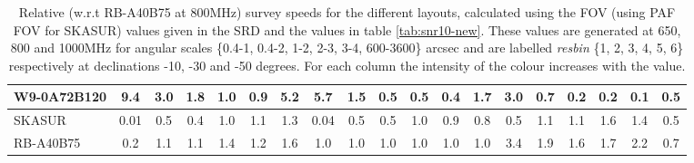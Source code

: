 \begin{table}[!htp]
{{\begin{tabular}{|lcccccc||cccccc||cccccc|}
W9-0A72B120 & 9.4 \cellcolor{blue!57.37} & 3.0 \cellcolor{red!54.92} & 1.8 \cellcolor{green!52.57} & 1.0 \cellcolor{orange!18.00} & 0.9 \cellcolor{purple!18.00} & 5.2 \cellcolor{blue!50.17} & 5.7 \cellcolor{blue!56.19} & 1.5 \cellcolor{red!51.92} & 0.5 \cellcolor{green!22.67} & 0.5 \cellcolor{orange!18.00} & 0.4 \cellcolor{purple!18.00} & 1.7 \cellcolor{blue!51.92} & 3.0 \cellcolor{blue!53.76} & 0.7 \cellcolor{red!24.89} & 0.2 \cellcolor{green!18.00} & 0.2 \cellcolor{orange!18.00} & 0.1 \cellcolor{purple!18.00} & 0.5 \cellcolor{blue!18.00}\\ \hline 
SKASUR & 0.01 \cellcolor{blue!18.00} & 0.5 \cellcolor{red!18.00} & 0.4 \cellcolor{green!18.00} & 1.0 \cellcolor{orange!24.00} & 1.1 \cellcolor{purple!48.55} & 1.3 \cellcolor{blue!18.00} & 0.04 \cellcolor{blue!18.00} & 0.5 \cellcolor{red!18.00} & 0.5 \cellcolor{green!18.00} & 1.0 \cellcolor{orange!57.90} & 0.9 \cellcolor{purple!53.00} & 0.8 \cellcolor{blue!18.00} & 0.5 \cellcolor{blue!18.00} & 1.1 \cellcolor{red!37.03} & 1.1 \cellcolor{green!45.41} & 1.6 \cellcolor{orange!55.51} & 1.4 \cellcolor{purple!43.33} & 0.5 \cellcolor{blue!18.00}\\ \hline 
RB-A40B75 & 0.2 \cellcolor{blue!18.98} & 1.1 \cellcolor{red!27.48} & 1.1 \cellcolor{green!36.21} & 1.4 \cellcolor{orange!60.00} & 1.2 \cellcolor{purple!60.00} & 1.6 \cellcolor{blue!20.68} & 1.0 \cellcolor{blue!24.47} & 1.0 \cellcolor{red!34.96} & 1.0 \cellcolor{green!60.00} & 1.0 \cellcolor{orange!60.00} & 1.0 \cellcolor{purple!60.00} & 1.0 \cellcolor{blue!24.46} & 3.4 \cellcolor{blue!60.00} & 1.9 \cellcolor{red!60.00} & 1.6 \cellcolor{green!60.00} & 1.7 \cellcolor{orange!60.00} & 2.2 \cellcolor{purple!60.00} & 0.7 \cellcolor{blue!60.00}\tabularnewline \hline 
\end{tabular}}\hfill 

\caption{Relative (w.r.t RB-A40B75 at 800MHz) survey speeds for the different layouts, calculated using the FOV (using PAF FOV for SKASUR) values given in the SRD \cite{srd} and the values in table \ref{tab:snr10-new}. These values are generated at 650, 800 and 1000MHz for angular scales \{0.4-1, 0.4-2, 1-2, 2-3, 3-4, 600-3600\} arcsec and are labelled {\it resbin} \{1, 2, 3, 4, 5, 6\} respectively at declinations -10, -30 and -50 degrees. For each column the intensity of the colour increases with the value.}\label{tab:speed-new}}
 \end{table}
